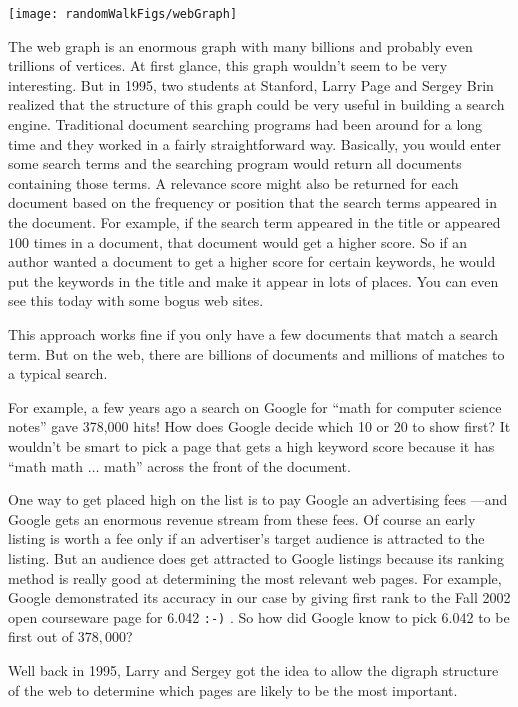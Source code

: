 \texttt{[image: randomWalkFigs/webGraph]}

The web graph is an enormous graph with many billions and probably even
trillions of vertices.  At first glance, this graph wouldn't seem to be very
interesting.  But in 1995, two students at Stanford, 
Larry Page and  Sergey Brin realized that the structure
of this graph could be very useful in building a search engine.
Traditional document searching programs had been around for a long time
and they worked in a fairly straightforward way.  Basically, you would
enter some search terms and the searching program would return all
documents containing those terms.  A relevance score might also be
returned for each document based on the frequency or position that the
search terms appeared in the document.  For example, if the search term
appeared in the title or appeared $100$ times in a document, that document
would get a higher score.  So if an author wanted a document to get a
higher score for certain keywords, he would put the keywords in the title
and make it appear in lots of places.  You can even see this today with
some bogus web sites.

This approach works fine if you only have a few documents that match a
search term.  But on the web, there are billions of documents and millions
of matches to a typical search.

For example, a few years ago a search on Google for ``math for computer
science notes'' gave 378,000 hits!  How does Google decide which 10 or 20
to show first?  It wouldn't be smart to pick a page that gets a high
keyword score because it has ``math math $\dots$ math'' across the front
of the document.

One way to get placed high on the list is to pay Google an advertising
fees ---and Google gets an enormous revenue stream from these fees.  Of
course an early listing is worth a fee only if an advertiser's target
audience is attracted to the listing.  But an audience does get attracted
to Google listings because its ranking method is really good at
determining the most relevant web pages.  For example, Google demonstrated
its accuracy in our case by giving first rank to the Fall 2002 open
courseware page for 6.042 \texttt{:-)} .  So how did Google know to pick
6.042 to be first out of $378,000$?

Well back in 1995, Larry and Sergey got the idea to allow the digraph
structure of the web to determine which pages are likely to be the most
important.

